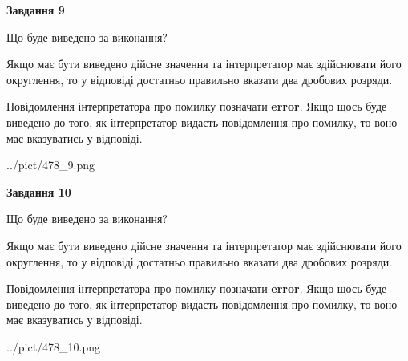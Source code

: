 \documentclass[12pt, ukrainian]{article}
\begin{document}
{\begin {Large}
{\begin {center}\textbf{Завдання 9}\end {center}}\par
Що буде виведено за виконання? \par

Якщо має бути виведено дійсне значення та інтерпретатор має здійснювати його округлення, 
то у відповіді достатньо правильно вказати два дробових розряди.

Повідомлення інтерпретатора про помилку позначати \textbf{error}.
Якщо щось буде виведено до того, як інтерпретатор видасть повідомлення про помилку, 
то воно має вказуватись у відповіді. \par

\begin{center}
	{../pict/478_9.png}
\end{center}
\newpage

{\begin {center}\textbf{Завдання 10}\end {center}}\par
Що буде виведено за виконання? \par

Якщо має бути виведено дійсне значення та інтерпретатор має здійснювати його округлення, 
то у відповіді достатньо правильно вказати два дробових розряди.

Повідомлення інтерпретатора про помилку позначати \textbf{error}.
Якщо щось буде виведено до того, як інтерпретатор видасть повідомлення про помилку, 
то воно має вказуватись у відповіді. \par

\begin{center}
	{../pict/478_10.png}
\end{center}
\newpage

\end {Large}}
\end{document}
